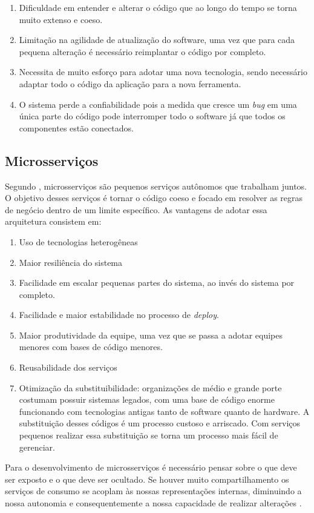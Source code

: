   \begin{enumerate}
    \item Dificuldade em entender e alterar o código que ao longo do tempo se torna
    muito extenso e coeso.
    \item Limitação na agilidade de atualização do software, uma vez que para cada
    pequena alteração é necessário reimplantar o código por completo.
    \item Necessita de muito esforço para adotar uma nova tecnologia, sendo
    necessário adaptar todo o código da aplicação para a nova ferramenta.
    \item O sistema perde a confiabilidade pois a medida que cresce um \textit{bug}
    em uma única parte do código pode interromper todo o software já que todos os
    componentes estão conectados.
  \end{enumerate}

\subsection{Microsserviços}

Segundo , microsserviços são pequenos serviços autônomos que
trabalham juntos. O objetivo desses serviços é tornar o código coeso e focado em
resolver as regras de negócio dentro de um limite específico. As vantagens de adotar
essa arquitetura consistem em:

\begin{enumerate}
    \item{Uso de tecnologias heterogêneas}
    \item{Maior resiliência do sistema}
    \item{Facilidade em escalar pequenas partes do sistema, ao invés do sistema por
    completo.}
    \item{Facilidade e maior estabilidade no processo de \textit{deploy}.}
    \item{Maior produtividade da equipe, uma vez que se passa a adotar equipes
    menores com bases de código menores.}
    \item{Reusabilidade dos serviços}
    \item{Otimização da substituibilidade: organizações de médio e grande porte costumam
    possuir sistemas legados, com uma base de código enorme funcionando com tecnologias
    antigas tanto de software quanto de hardware. A substituição desses códigos é um
    processo custoso e arriscado. Com serviços pequenos realizar essa substituição
    se torna um processo mais fácil de gerenciar.}
\end{enumerate}

Para o desenvolvimento de microsserviços é necessário pensar sobre o que deve ser
exposto e o que deve ser ocultado. Se houver muito compartilhamento os serviços de
consumo se acoplam às nossas representações internas, diminuindo a nossa autonomia
e consequentemente a nossa capacidade de realizar alterações \cite{Newman2015}.

